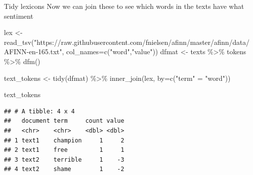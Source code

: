 \documentclass[
  10pt,
  ignorenonframetext,
  aspectratio=169]{beamer}
\newenvironment{Shaded}{\begin{snugshade}}{\end{snugshade}}
\newcommand{\AttributeTok}[1]{\textcolor[rgb]{0.80,0.80,0.80}{#1}}
\newcommand{\FunctionTok}[1]{\textcolor[rgb]{0.94,0.94,0.56}{#1}}
\newcommand{\NormalTok}[1]{\textcolor[rgb]{0.80,0.80,0.80}{#1}}
\newcommand{\OtherTok}[1]{\textcolor[rgb]{0.94,0.94,0.56}{#1}}
\newcommand{\SpecialCharTok}[1]{\textcolor[rgb]{0.86,0.64,0.64}{#1}}
\newcommand{\StringTok}[1]{\textcolor[rgb]{0.80,0.58,0.58}{#1}}
\begin{document}
\begin{frame}[fragile]{Tidy lexicons}
\protect\hypertarget{tidy-lexicons}{}
Now we can join these to see which words in the texts have what
sentiment

\medskip
\scriptsize

\begin{Shaded}
\begin{Highlighting}[]
\NormalTok{lex }\OtherTok{\textless{}{-}} \FunctionTok{read\_tsv}\NormalTok{(}\StringTok{"https://raw.githubusercontent.com/fnielsen/afinn/master/afinn/data/AFINN{-}en{-}165.txt"}\NormalTok{, }\AttributeTok{col\_names=}\FunctionTok{c}\NormalTok{(}\StringTok{"word"}\NormalTok{,}\StringTok{"value"}\NormalTok{))}
\NormalTok{dfmat }\OtherTok{\textless{}{-}}\NormalTok{ texts }\SpecialCharTok{\%\textgreater{}\%}
\NormalTok{  tokens }\SpecialCharTok{\%\textgreater{}\%}
  \FunctionTok{dfm}\NormalTok{()}

\NormalTok{text\_tokens }\OtherTok{\textless{}{-}} \FunctionTok{tidy}\NormalTok{(dfmat) }\SpecialCharTok{\%\textgreater{}\%} 
  \FunctionTok{inner\_join}\NormalTok{(lex, }\AttributeTok{by=}\FunctionTok{c}\NormalTok{(}\StringTok{"term"} \OtherTok{=} \StringTok{"word"}\NormalTok{))}

\NormalTok{text\_tokens}
\end{Highlighting}
\end{Shaded}

\begin{verbatim}
## # A tibble: 4 x 4
##   document term     count value
##   <chr>    <chr>    <dbl> <dbl>
## 1 text1    champion     1     2
## 2 text1    free         1     1
## 3 text2    terrible     1    -3
## 4 text2    shame        1    -2
\end{verbatim}
\end{frame}
\end{document}
